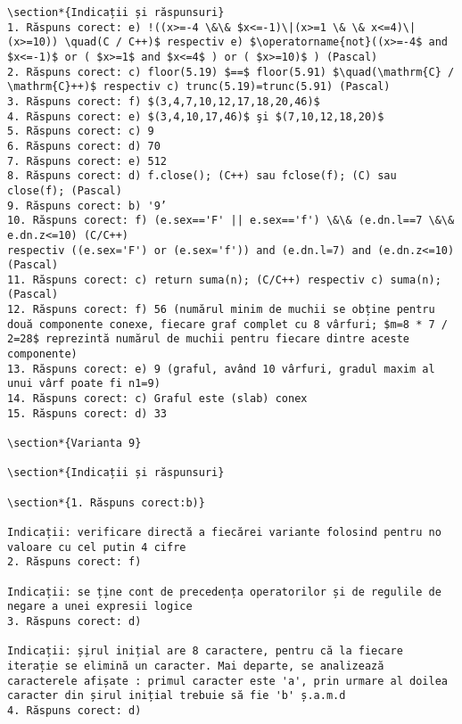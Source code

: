 \begin{verbatim}
\section*{Indicații și răspunsuri}
1. Răspuns corect: e) !((x>=-4 \&\& $x<=-1)\|(x>=1 \& \& x<=4)\|(x>=10)) \quad(C / C++)$ respectiv e) $\operatorname{not}((x>=-4$ and $x<=-1)$ or ( $x>=1$ and $x<=4$ ) or ( $x>=10)$ ) (Pascal)
2. Răspuns corect: c) floor(5.19) $==$ floor(5.91) $\quad(\mathrm{C} / \mathrm{C}++)$ respectiv c) trunc(5.19)=trunc(5.91) (Pascal)
3. Răspuns corect: f) $(3,4,7,10,12,17,18,20,46)$
4. Răspuns corect: e) $(3,4,10,17,46)$ şi $(7,10,12,18,20)$
5. Răspuns corect: c) 9
6. Răspuns corect: d) 70
7. Răspuns corect: e) 512
8. Răspuns corect: d) f.close(); (C++) sau fclose(f); (C) sau close(f); (Pascal)
9. Răspuns corect: b) '9’
10. Răspuns corect: f) (e.sex=='F' || e.sex=='f') \&\& (e.dn.l==7 \&\& e.dn.z<=10) (C/C++)
respectiv ((e.sex='F') or (e.sex='f')) and (e.dn.l=7) and (e.dn.z<=10) (Pascal)
11. Răspuns corect: c) return suma(n); (C/C++) respectiv c) suma(n); (Pascal)
12. Răspuns corect: f) 56 (numărul minim de muchii se obține pentru două componente conexe, fiecare graf complet cu 8 vârfuri; $m=8 * 7 / 2=28$ reprezintă numărul de muchii pentru fiecare dintre aceste componente)
13. Răspuns corect: e) 9 (graful, având 10 vârfuri, gradul maxim al unui vârf poate fi n1=9)
14. Răspuns corect: c) Graful este (slab) conex
15. Răspuns corect: d) 33

\section*{Varianta 9}

\section*{Indicații și răspunsuri}

\section*{1. Răspuns corect:b)}

Indicații: verificare directă a fiecărei variante folosind pentru no valoare cu cel putin 4 cifre
2. Răspuns corect: f)

Indicații: se ț̦ine cont de precedența operatorilor și de regulile de negare a unei expresii logice
3. Răspuns corect: d)

Indicații: ș̦irul inițial are 8 caractere, pentru că la fiecare iterație se elimină un caracter. Mai departe, se analizează caracterele afișate : primul caracter este 'a', prin urmare al doilea caracter din șirul inițial trebuie să fie 'b' ș.a.m.d
4. Răspuns corect: d)


\end{verbatim}

